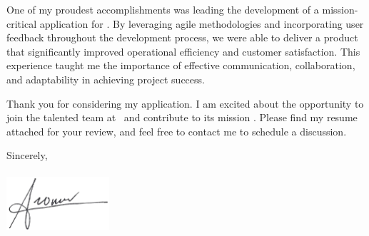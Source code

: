 \documentclass[11pt]{letter}
\begin{document}
One of my proudest accomplishments was leading the development of a mission-critical application for \previousCompany.
By leveraging agile methodologies and incorporating user feedback throughout the development process, we were able to deliver a product that significantly improved operational efficiency and customer satisfaction.
This experience taught me the importance of effective communication, collaboration, and adaptability in achieving project success.

Thank you for considering my application. I am excited about the opportunity to join the talented team at \companyName\, and contribute to its mission \companyMission.
Please find my resume attached for your review, and feel free to contact me to schedule a discussion.


\vspace{0.1in}
\vfill

\begin{flushright}

\vspace{-0.1in}
Sincerely, \\
\myname\\

\includegraphics[width=1.5in]{signiture_no_background.png}

\vspace{-0.1in}
\mytitle

\end{flushright}
\end{document}

